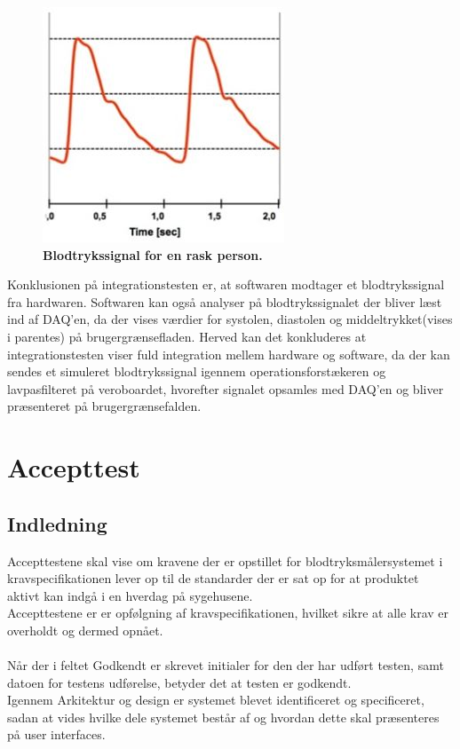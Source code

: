 \begin{figure}[htb]
\begin{minipage}{0.45\textwidth}
      \includegraphics[width=\textwidth]{billeder/blodtryk_graf}
      \caption{\textbf{Blodtrykssignal for en rask person.}}
    \label{fig:figur2}
  \end{minipage}
\end{figure}
Konklusionen på integrationstesten er, at softwaren modtager et blodtrykssignal fra hardwaren. Softwaren kan også analyser på blodtrykssignalet der bliver læst ind af DAQ’en, da der vises værdier for systolen, diastolen og middeltrykket(vises i parentes) på brugergrænsefladen. Herved kan det konkluderes at integrationstesten viser fuld integration mellem hardware og software, da der kan sendes et simuleret blodtrykssignal igennem operationsforstækeren og lavpasfilteret på veroboardet, hvorefter signalet opsamles med DAQ’en og bliver præsenteret på brugergrænsefalden.
\chapter{Accepttest}
\section{Indledning}
Accepttestene skal vise om kravene der er opstillet for blodtryksmålersystemet i kravspecifikationen lever op til de standarder der er sat op for at produktet aktivt kan indgå i en hverdag på sygehusene.\\
Accepttestene er er opfølgning af kravspecifikationen, hvilket sikre at alle krav er overholdt og dermed opnået.\\\\
Når der i feltet Godkendt er skrevet initialer for den der har udført testen, samt datoen for testens udførelse, betyder det at testen er godkendt.  \\
Igennem Arkitektur og design er systemet blevet identificeret og specificeret, sadan at vides hvilke dele systemet består af og hvordan dette skal præsenteres på user interfaces.
